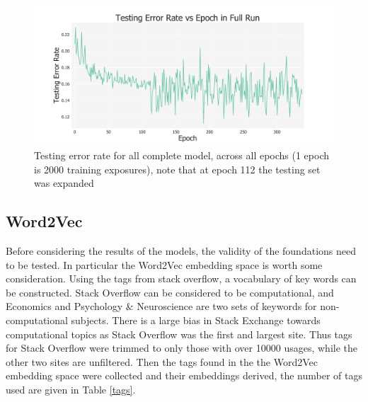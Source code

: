 \documentclass[12pt, a4paper]{article}
\begin{document}
\begin{figure}[H]
	\centering
	\begin{adjustbox}{center}
		\includegraphics[width=1.3\textwidth]{full_testing_error_rate}
	\end{adjustbox}
	\caption{Testing error rate for all complete  model, across all epochs (1 epoch is 2000 training exposures), note that at epoch 112 the testing set was expanded}\label{full_testing_error_rate}
\end{figure}

\subsection{Word2Vec}

Before considering the results of the models, the validity of the foundations need to be tested. In particular the Word2Vec embedding space is worth some consideration. Using the tags from stack overflow, a vocabulary of key words can be constructed. Stack Overflow can be considered to be computational, and Economics and Psychology \& Neuroscience are two sets of keywords for non-computational subjects. There is a large bias in Stack Exchange towards computational topics as Stack Overflow was the first and largest site. Thus tags for Stack Overflow were trimmed to only those with over \num{10000} usages, while the other two sites are unfiltered. Then the tags found in the the Word2Vec embedding space were collected and their embeddings derived, the number of tags used are given in Table \ref{tags}. 
\end{document}
